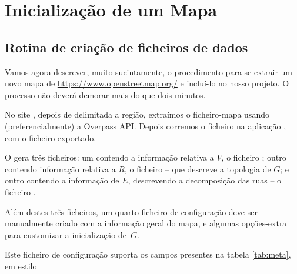 \documentclass[relatorio.tex]{subfiles}
\begin{document}
\section{Inicialização de um Mapa}
\label{sec:loadmap}

\subsection{Rotina de criação de ficheiros de dados}
\label{subsec:routinefiles}

Vamos agora descrever, muito sucintamente, o
procedimento para se extrair um novo mapa de
\url{https://www.openstreetmap.org/}
e incluí-lo no nosso projeto. O processo não
deverá demorar mais do que dois minutos.

No site \osm{}, depois de delimitada a região, extraímos o
ficheiro-mapa  usando (preferencialmente)
a Overpass API. Depois corremos o ficheiro na aplicação , com o ficheiro exportado.

O  gera três ficheiros: um contendo a informação
relativa a $V$, o ficheiro ; outro
contendo informação relativa a $R$, o ficheiro 
-- que descreve a topologia de $G$; e outro contendo a
informação de $E$, descrevendo a decomposição das ruas
-- o ficheiro .

Além destes três ficheiros, um quarto ficheiro de configuração
 deve ser manualmente criado com a informação geral
do mapa, e algumas opções-extra para customizar a inicialização
de~$G$.

Este ficheiro de configuração suporta os campos presentes na
tabela \ref{tab:meta}, em estilo 
\end{document}
